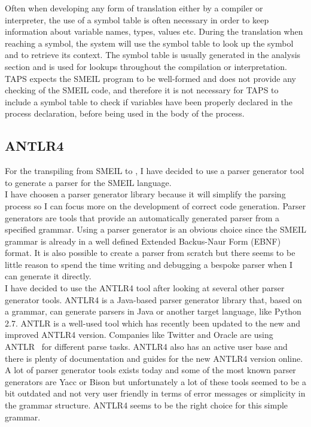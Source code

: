 Often when developing any form of translation either by a compiler or interpreter, the use of a symbol table is often necessary in order to keep information about variable names, types, values etc. During the translation when reaching a symbol, the system will use the symbol table to look up the symbol and to retrieve its context. The symbol table is usually generated in the analysis section and is used for lookups throughout the compilation or interpretation. TAPS expects the SMEIL program to be well-formed and does not provide any checking of the SMEIL code, and therefore it is not necessary for TAPS to include a symbol table to check if variables have been properly declared in the process declaration, before being used in the body of the process.
\subsection{ANTLR4}
For the transpiling from SMEIL to \cspm{}, I have decided to use a parser generator tool to generate a parser for the SMEIL language.\\

I have choosen a parser generator library because it will simplify the parsing process so I can focus more on the development of correct code generation. Parser generators are tools that provide an automatically generated parser from a specified grammar. Using a parser generator is an obvious choice since the SMEIL grammar is already in a well defined Extended Backus-Naur Form (EBNF) format. It is also possible to create a parser from scratch but there seems to be little reason to spend the time writing and debugging a bespoke parser when I can generate it directly. \\

I have decided to use the ANTLR4 tool after looking at several other parser generator tools. ANTLR4 is a Java-based parser generator library that, based on a grammar, can generate parsers in Java or another target language, like Python 2.7. ANTLR is a well-used tool which has recently been updated to the new and improved ANTLR4 version. Companies like Twitter and Oracle are using ANTLR~\cite{Parr2012} for different parse tasks. ANTLR4 also has an active user base and there is plenty of documentation and guides for the new ANTLR4 version online. A lot of parser generator tools exists today and some of the most known parser generators are Yacc or Bison but unfortunately a lot of these tools seemed to be a bit outdated and not very user friendly in terms of error messages or simplicity in the grammar structure. ANTLR4 seems to be the right choice for this simple grammar.\\

